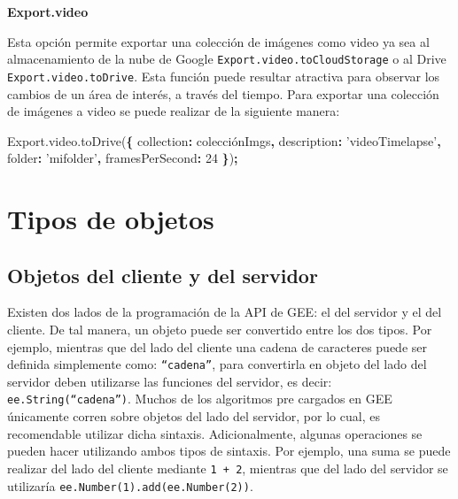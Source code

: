 \documentclass[
]{article}
\newenvironment{Shaded}{\begin{snugshade}}{\end{snugshade}}
\newcommand{\AttributeTok}[1]{\textcolor[rgb]{0.77,0.63,0.00}{#1}}
\newcommand{\DataTypeTok}[1]{\textcolor[rgb]{0.13,0.29,0.53}{#1}}
\newcommand{\DecValTok}[1]{\textcolor[rgb]{0.00,0.00,0.81}{#1}}
\newcommand{\NormalTok}[1]{#1}
\newcommand{\OperatorTok}[1]{\textcolor[rgb]{0.81,0.36,0.00}{\textbf{#1}}}
\newcommand{\StringTok}[1]{\textcolor[rgb]{0.31,0.60,0.02}{#1}}
\newcommand{\VariableTok}[1]{\textcolor[rgb]{0.00,0.00,0.00}{#1}}
\begin{document}
\textbf{Export.video}

Esta opción permite exportar una colección de imágenes como video ya sea
al almacenamiento de la nube de Google
\texttt{Export.video.toCloudStorage} o al Drive
\texttt{Export.video.toDrive}. Esta función puede resultar atractiva
para observar los cambios de un área de interés, a través del tiempo.
Para exportar una colección de imágenes a video se puede realizar de la
siguiente manera:

\begin{Shaded}
\begin{Highlighting}[]
\VariableTok{Export}\NormalTok{.}\VariableTok{video}\NormalTok{.}\AttributeTok{toDrive}\NormalTok{(}\OperatorTok{\{}
    \DataTypeTok{collection}\OperatorTok{:}\NormalTok{ colecciónImgs}\OperatorTok{,}
    \DataTypeTok{description}\OperatorTok{:} \StringTok{'videoTimelapse'}\OperatorTok{,}
    \DataTypeTok{folder}\OperatorTok{:} \StringTok{'mifolder'}\OperatorTok{,}
    \DataTypeTok{framesPerSecond}\OperatorTok{:} \DecValTok{24}
 \OperatorTok{\}}\NormalTok{)}\OperatorTok{;}
\end{Highlighting}
\end{Shaded}

\newpage

\hypertarget{tipos-de-objetos}{%
\section{Tipos de objetos}\label{tipos-de-objetos}}

\hypertarget{objetos-del-cliente-y-del-servidor}{%
\subsection{Objetos del cliente y del
servidor}\label{objetos-del-cliente-y-del-servidor}}

Existen dos lados de la programación de la API de GEE: el del servidor y
el del cliente. De tal manera, un objeto puede ser convertido entre los
dos tipos. Por ejemplo, mientras que del lado del cliente una cadena de
caracteres puede ser definida simplemente como: \texttt{“cadena”}, para
convertirla en objeto del lado del servidor deben utilizarse las
funciones del servidor, es decir: \texttt{ee.String(“cadena”)}. Muchos
de los algoritmos pre cargados en GEE únicamente corren sobre objetos
del lado del servidor, por lo cual, es recomendable utilizar dicha
sintaxis. Adicionalmente, algunas operaciones se pueden hacer utilizando
ambos tipos de sintaxis. Por ejemplo, una suma se puede realizar del
lado del cliente mediante \texttt{1\ +\ 2}, mientras que del lado del
servidor se utilizaría \texttt{ee.Number(1).add(ee.Number(2))}.
\end{document}
